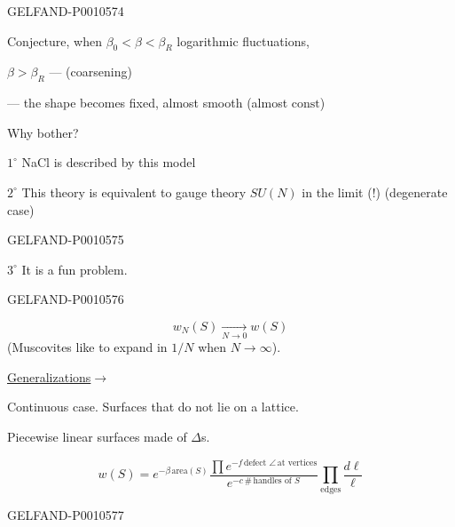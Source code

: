 \begin{GelfandAdjacentEvidence}{GELFAND-P001057}{4}


Conjecture, when \(\beta_0<\beta<\beta_R\) logarithmic fluctuations,

\(\beta>\beta_R\) —  (coarsening)

— the shape becomes fixed, almost smooth (almost \(\mathrm{const}\))

Why bother?

\(1^\circ\) NaCl is described by this model

\(2^\circ\) This theory is equivalent to gauge theory \(SU(N)\) in the limit  (!) (degenerate case)
\end{GelfandAdjacentEvidence}
\begin{GelfandAdjacentEvidence}{GELFAND-P001057}{5}


\(3^\circ\) It is a fun problem.
\end{GelfandAdjacentEvidence}
\begin{GelfandAdjacentEvidence}{GELFAND-P001057}{6}


\[
w_N(S)\underset{N\to0}{\longrightarrow}w(S)
\]
(Muscovites like to expand in \(1/N\) when \(N\to\infty\)).

\quad {}\quad
{}

\underline{Generalizations}\(\rightarrow\)

Continuous case. Surfaces that do not lie on a lattice.

Piecewise linear surfaces made of \(\Delta\)s.

\begin{equation*}
w(S)=e^{-\beta\,\mathrm{area}(S)}
  \frac{\prod e^{-f\,\text{defect }\angle\,\text{at vertices}}}
       {e^{-c\,\#\,\text{handles of }S}}
  \prod_{\text{edges}}\frac{d\ell}{\ell}
\tag{14}
\end{equation*}
\end{GelfandAdjacentEvidence}
\begin{GelfandAdjacentEvidence}{GELFAND-P001057}{7}


\end{GelfandAdjacentEvidence}


